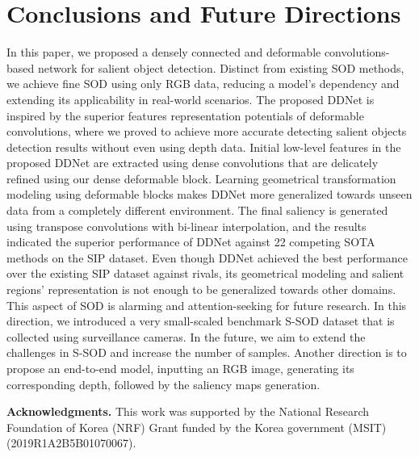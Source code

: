 \documentclass{article}
\begin{document}
\section{Conclusions and Future Directions}
In this paper, we proposed a densely connected and deformable convolutions-based network for salient object detection. Distinct from existing SOD methods, we achieve fine SOD using only RGB data, reducing a model's dependency and extending its applicability in real-world scenarios. The proposed DDNet is inspired by the superior features representation potentials of deformable convolutions, where we proved to achieve more accurate detecting salient objects detection results without even using depth data. Initial low-level features in the proposed DDNet are extracted using dense convolutions that are delicately refined using our dense deformable block. Learning geometrical transformation modeling using deformable blocks makes DDNet more generalized towards unseen data from a completely different environment. The final saliency is generated using transpose convolutions with bi-linear interpolation, and the results indicated the superior performance of DDNet against 22 competing SOTA methods on the SIP dataset. Even though DDNet achieved the best performance over the existing SIP dataset against rivals, its geometrical modeling and salient regions' representation is not enough to be generalized towards other domains. This aspect of SOD is alarming and attention-seeking for future research. In this direction, we introduced a very small-scaled benchmark S-SOD dataset that is collected using surveillance cameras. In the future, we aim to extend the challenges in S-SOD and increase the number of samples. Another direction is to propose an end-to-end model, inputting an RGB image, generating its corresponding depth, followed by the saliency maps generation.


\hspace{0.7mm} \textbf{Acknowledgments.} This work was supported by the National Research Foundation of Korea (NRF) Grant funded by the Korea government (MSIT) (2019R1A2B5B01070067).



\end{document}

